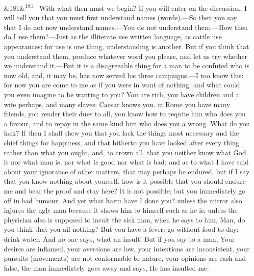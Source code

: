 \documentclass[12pt]{article}
\newcommand{\para}[1][]{\par\noindent\ifx&#1&\else\textsuperscript{\footnotesize #1}~\fi}
\begin{document}
\para[181] With what then must we begin? If you will enter on the discussion, I will tell you that you must first understand names (words).—So then you say that I do not now understand names.—You do not understand them.—How then do I use them?—Just as the illiterate use written language, as cattle use appearances: for use is one thing, understanding is another. But if you think that you understand them, produce whatever word you please, and let us try whether we understand it.—But it is a disagreeable thing for a man to be confuted who is now old, and, it may be, has now served his three campaigns.—I too know this: for now you are come to me as if you were in want of nothing: and what could you even imagine to be wanting to you? You are rich, you have children and a wife perhaps, and many slaves: Caesar knows you, in Rome you have many friends, you render their dues to all, you know how to requite him who does you a favour, and to repay in the same kind him who does you a wrong. What do you lack? If then I shall shew you that you lack the things most necessary and the chief things for happiness, and that hitherto you have looked after every thing rather than what you ought, and, to crown all, that you neither know what God is nor what man is, nor what is good nor what is bad; and as to what I have said about your ignorance of other matters, that may perhaps be endured, but if I say that you know nothing about yourself, how is it possible that you should endure me and bear the proof and stay here? It is not possible; but you immediately go off in bad humour. And yet what harm have I done you? unless the mirror also injures the ugly man because it shows him to himself such as he is; unless the physician also is supposed to insult the sick man, when he says to him, Man, do you think that you ail nothing? But you have a fever: go without food to-day; drink water. And no one says, what an insult! But if you say to a man, Your desires are inflamed, your aversions are low, your intentions are inconsistent, your pursuits (movements) are not conformable to nature, your opinions are rash and false, the man immediately goes away and says, He has insulted me.
\end{document}
